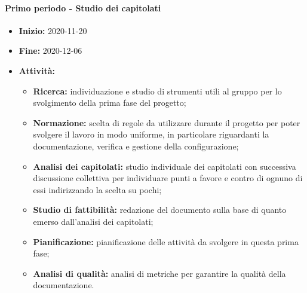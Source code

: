 \paragraph[Primo periodo]{Primo periodo - \textnormal{Studio dei capitolati}}
\begin{itemize}
    \item [] \textbf{Inizio:} 2020-11-20
    \item [] \textbf{Fine:} 2020-12-06
    \item [] \textbf{Attività:}
          \begin{itemize}
              \item \textbf{Ricerca:} individuazione e studio di strumenti utili al gruppo per lo svolgimento della prima fase del progetto;
              \item \textbf{Normazione:} scelta di regole da utilizzare durante il progetto per poter svolgere il lavoro in modo uniforme, in particolare riguardanti la documentazione, verifica e gestione della configurazione;
              \item \textbf{Analisi dei capitolati:} studio individuale dei capitolati con successiva discussione collettiva per individuare punti a favore e contro di ognuno di essi indirizzando la scelta su pochi;
              \item \textbf{Studio di fattibilità:} redazione del documento sulla base di quanto emerso dall'analisi dei capitolati;
              \item \textbf{Pianificazione:} pianificazione delle attività da svolgere in questa prima fase;
              \item \textbf{Analisi di qualità:} analisi di metriche per garantire la qualità della documentazione.
          \end{itemize}
\end{itemize}

